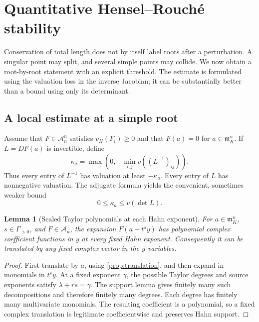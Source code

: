 \documentclass[11pt,letterpaper]{article}
\newtheorem{lemma}[lemma]{Lemma}
\theoremstyle{definition}
\theoremstyle{remark}
\newcommand{\A}{\mathscr A}
\newcommand{\m}{\mathfrak m}
\newcommand{\vH}{v_{\!H}}
\numberwithin{equation}{section}
\begin{document}
\section{Quantitative Hensel--Rouch\'e stability}\label{sec:stability}

Conservation of total length does not by itself label roots after a perturbation. A singular point may split, and several simple points may collide. We now obtain a root-by-root statement with an explicit threshold. The estimate is formulated using the valuation loss in the inverse Jacobian; it can be substantially better than a bound using only its determinant.

\subsection{A local estimate at a simple root}
Assume that $F\in\A_n^n$ satisfies $\vH(F_i)\ge0$ and that $F(a)=0$ for $a\in\m_K^n$. If $L=DF(a)$ is invertible, define
\begin{equation}\label{eq:kappa}
 \kappa_a=\max\left(0,-\min_{i,j}v((L^{-1})_{ij})\right).
\end{equation}
Thus every entry of $L^{-1}$ has valuation at least $-\kappa_a$. Every entry of $L$ has nonnegative valuation. The adjugate formula yields the convenient, sometimes weaker bound
\begin{equation}\label{eq:det-bound}
 0\le\kappa_a\le v(\det L).
\end{equation}

\begin{lemma}[Scaled Taylor polynomials at each Hahn exponent]\label{lem:scaled-polynomial}
For $a\in\m_K^n$, $s\in\Gamma_{>0}$, and $F\in\A_n$, the expansion $F(a+t^sy)$ has polynomial complex coefficient functions in $y$ at every fixed Hahn exponent. Consequently it can be translated by any fixed complex vector in the $y$ variables.
\end{lemma}
\begin{proof}
First translate by $a$, using \cref{prop:translation}, and then expand in monomials in $t^sy$. At a fixed exponent $\gamma$, the possible Taylor degrees and source exponents satisfy $\lambda+rs=\gamma$. The support lemma gives finitely many such decompositions and therefore finitely many degrees. Each degree has finitely many multivariate monomials. The resulting coefficient is a polynomial, so a fixed complex translation is legitimate coefficientwise and preserves Hahn support.
\end{proof}
\end{document}
